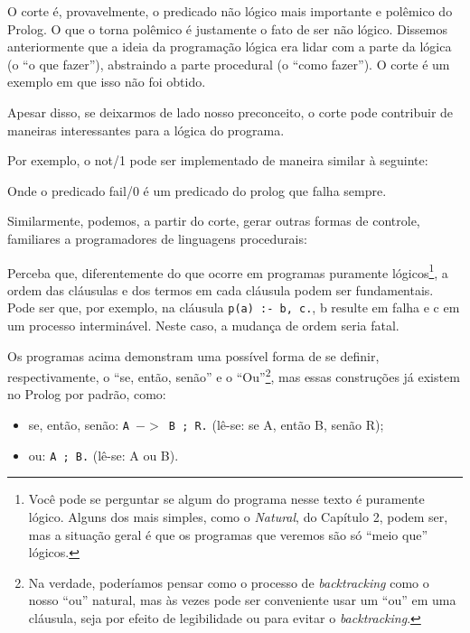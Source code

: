 \documentclass{article}
\begin{document}
O corte é, provavelmente, o predicado não lógico mais importante e polêmico do Prolog. O que o torna polêmico é justamente o fato de ser não lógico. Dissemos anteriormente que a ideia da programação lógica era lidar com a parte da lógica (o ``o que fazer''), abstraindo a parte procedural (o ``como fazer''). O corte é um exemplo em que isso não foi obtido.

Apesar disso, se deixarmos de lado nosso preconceito, o corte pode contribuir de maneiras interessantes para a lógica do programa.

Por exemplo, o not/1 pode ser implementado de maneira similar à seguinte:



Onde o predicado fail/0 é um predicado do prolog que falha sempre.

Similarmente, podemos, a partir do corte, gerar outras formas de controle, familiares a programadores de linguagens procedurais:





Perceba que, diferentemente do que ocorre em programas puramente lógicos\footnote{Você pode se perguntar se algum do programa nesse texto é puramente lógico. Alguns dos mais simples, como o \textit{Natural}, do Capítulo 2, %
podem ser, mas a situação geral é que os programas que veremos são só ``meio que'' lógicos.}, a ordem das cláusulas e dos termos em cada cláusula podem ser fundamentais. Pode ser que, por exemplo, na cláusula {\tt p(a) :- b, c.}, b resulte em falha e c em um
processo interminável. Neste caso, a mudança de ordem seria fatal.

Os programas acima demonstram uma possível forma de se definir, respectivamente, o ``se, então, senão'' e o ``Ou''\footnote{Na verdade, poderíamos pensar como o processo de \textit{backtracking} como o nosso ``ou'' natural, mas às vezes pode ser conveniente usar um ``ou'' em uma cláusula, seja por efeito de legibilidade ou para evitar o \textit{backtracking}.}, mas essas construções já existem no Prolog por padrão, como:

\begin{itemize}
  \item se, então, senão: {\tt A $->$ B ; R.} (lê-se: se A, então B, senão R);
  \item ou: {\tt A ; B.} (lê-se: A ou B).
\end{itemize}


  \begin{thebibliography}{2}


  \end{thebibliography}
\end{document}
